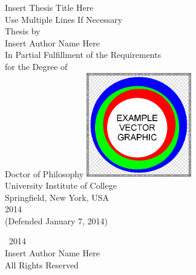 
\thispagestyle{empty}

\begin{titlepage}
\centering
{}
\null
\vspace*{0.25in}
\UseLMSSBoldFont\huge
Insert Thesis Title Here
\\[0.25em]
Use Multiple Lines If Necessary
\\[0.4in]
\normalfont\large
Thesis by
\\[0.25em]
\UseLMSSBoldFont\Large
Insert Author Name Here
\\[0.4in]
\normalfont\normalsize
In Partial Fulfillment of the Requirements
\\[0.5em]
for the Degree of
\\[0.5em]
Doctor of Philosophy
\vfill
\includegraphics[height=1.8in]
{Figure-SchoolLogo}
\\[0.5em]
University Institute of College
\\[0.5em]
Springfield, New York, USA
\\[1.5em]
2014
\\[0.5em]
(Defended January 7, 2014)
\par
\end{titlepage}


\pagestyle{plain}
\setcounter{page}{2}

{\centering
\null
\vfill
\raisebox{0.15em}{\scriptsize\sffamily\textcopyright}~2014
\\
Insert Author Name Here
\\
All Rights Reserved
\par}

\clearpage


